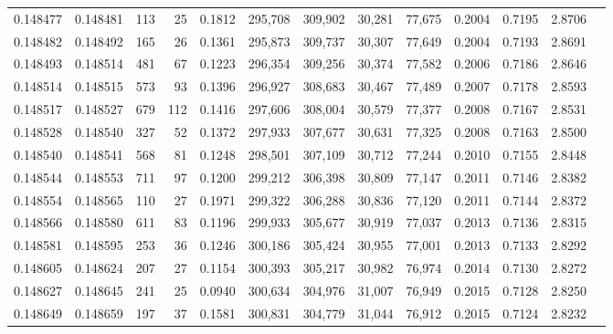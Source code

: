 \begin{tabular}{rrrrrrrrrrrrr}
0.148477 & 0.148481 &   113 &  25 &                                     0.1812 & 295,708 & 309,902 &  30,281 &  77,675 & 0.2004 & 0.7195 & 2.8706 \\
0.148482 & 0.148492 &   165 &  26 &                                     0.1361 & 295,873 & 309,737 &  30,307 &  77,649 & 0.2004 & 0.7193 & 2.8691 \\
0.148493 & 0.148514 &   481 &  67 &                                     0.1223 & 296,354 & 309,256 &  30,374 &  77,582 & 0.2006 & 0.7186 & 2.8646 \\
0.148514 & 0.148515 &   573 &  93 &                                     0.1396 & 296,927 & 308,683 &  30,467 &  77,489 & 0.2007 & 0.7178 & 2.8593 \\
0.148517 & 0.148527 &   679 & 112 &                                     0.1416 & 297,606 & 308,004 &  30,579 &  77,377 & 0.2008 & 0.7167 & 2.8531 \\
0.148528 & 0.148540 &   327 &  52 &                                     0.1372 & 297,933 & 307,677 &  30,631 &  77,325 & 0.2008 & 0.7163 & 2.8500 \\
0.148540 & 0.148541 &   568 &  81 &                                     0.1248 & 298,501 & 307,109 &  30,712 &  77,244 & 0.2010 & 0.7155 & 2.8448 \\
0.148544 & 0.148553 &   711 &  97 &                                     0.1200 & 299,212 & 306,398 &  30,809 &  77,147 & 0.2011 & 0.7146 & 2.8382 \\
0.148554 & 0.148565 &   110 &  27 &                                     0.1971 & 299,322 & 306,288 &  30,836 &  77,120 & 0.2011 & 0.7144 & 2.8372 \\
0.148566 & 0.148580 &   611 &  83 &                                     0.1196 & 299,933 & 305,677 &  30,919 &  77,037 & 0.2013 & 0.7136 & 2.8315 \\
0.148581 & 0.148595 &   253 &  36 &                                     0.1246 & 300,186 & 305,424 &  30,955 &  77,001 & 0.2013 & 0.7133 & 2.8292 \\
0.148605 & 0.148624 &   207 &  27 &                                     0.1154 & 300,393 & 305,217 &  30,982 &  76,974 & 0.2014 & 0.7130 & 2.8272 \\
0.148627 & 0.148645 &   241 &  25 &                                     0.0940 & 300,634 & 304,976 &  31,007 &  76,949 & 0.2015 & 0.7128 & 2.8250 \\
0.148649 & 0.148659 &   197 &  37 &                                     0.1581 & 300,831 & 304,779 &  31,044 &  76,912 & 0.2015 & 0.7124 & 2.8232 \\

\end{tabular}
